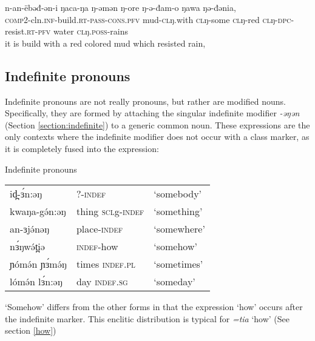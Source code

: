 \ea \gll n-an-ëbəđ-ən-i ŋaca-ŋa ŋ-əmən ŋ-ore ŋ-ə-đam-o ŋawa ŋə-đənia,\\
\textsc{comp}2-cln.\textsc{inf}-build.\textsc{rt}-\textsc{pass}-\textsc{cons}.\textsc{pfv} mud-\textsc{cl}ŋ.with \textsc{cl}ŋ-some \textsc{cl}ŋ-red \textsc{cl}ŋ-\textsc{dpc}-resist.\textsc{rt}-\textsc{pfv} water \textsc{cl}ŋ.\textsc{poss}-rains\\
\glt it is build with a red colored mud which resisted rain,
\z 

\subsection{Indefinite pronouns}%

Indefinite pronouns are not really pronouns, but rather are modified nouns. Specifically, they are formed by attaching the singular indefinite modifier \textit{-əŋən} (Section \ref{section:indefinite}) to a generic common noun. These expressions are the only contexts where the indefinite modifier does not occur with a class marker, as it is completely fused into the expression:

\ea Indefinite pronouns\\
\begin{tabular}[t]{lll}
id̪-ɜ́n:əŋ		& ?-\textsc{indef} & ‘somebody’ \\%
kwaŋa-gə́n:əŋ	& thing \textsc{scl}g-\textsc{indef} & ‘something’\\
an-ɜjə́nəŋ		& place-\textsc{indef} & ‘somewhere’\\
nɜ́ŋwə́t̪iə	& \textsc{indef}-how	& ‘somehow’\\
ɲómə́n ɲɜ́mə́ŋ		& times \textsc{indef}.\textsc{pl} & ‘sometimes’\\
lómə́n lɜ́n:əŋ	& day \textsc{indef}.\textsc{sg} & ‘someday’\\\end{tabular} 
\z
`Somehow' differs from the other forms in that the expression `how' occurs after the indefinite marker. This enclitic distribution is typical for \textit{=tia} `how' (See section \ref{how})




